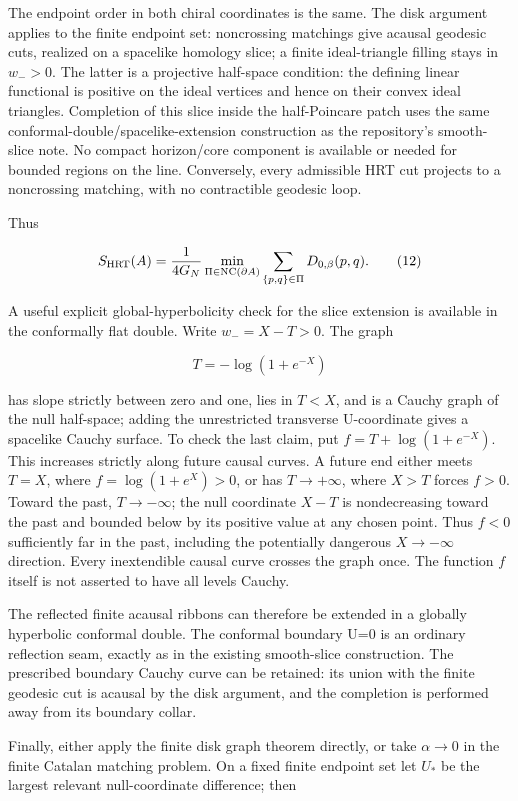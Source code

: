 \documentclass[11pt]{article}
\begin{document}
The endpoint order in both chiral coordinates is the same. The disk
argument applies to the finite endpoint set: noncrossing matchings give
acausal geodesic cuts, realized on a spacelike homology slice; a finite
ideal-triangle filling stays in \(w_->0\). The latter is a projective
half-space condition: the defining linear functional is positive on the
ideal vertices and hence on their convex ideal triangles. Completion of
this slice inside the half-Poincare patch uses the same
conformal-double/spacelike-extension construction as the repository's
smooth-slice note. No compact horizon/core component is available or
needed for bounded regions on the line. Conversely, every admissible HRT
cut projects to a noncrossing matching, with no contractible geodesic
loop.

Thus

\[
S_{\rm HRT}(A)=\frac1{4G_N}
\min_{\Pi\in\mathrm{NC}(\partial A)}
\sum_{\{p,q\}\in\Pi}D_{0,\beta}(p,q).
\tag{12}
\]

A useful explicit global-hyperbolicity check for the slice extension is
available in the conformally flat double. Write \(w_-=X-T>0\). The graph

\[
T=-\log(1+e^{-X})
\]

has slope strictly between zero and one, lies in \(T<X\), and is a
Cauchy graph of the null half-space; adding the unrestricted transverse
U-coordinate gives a spacelike Cauchy surface. To check the last claim,
put \(f=T+\log(1+e^{-X})\). This increases strictly along future causal
curves. A future end either meets \(T=X\), where \(f=\log(1+e^X)>0\), or
has \(T\to+\infty\), where \(X>T\) forces \(f>0\). Toward the past,
\(T\to-\infty\); the null coordinate \(X-T\) is nondecreasing toward the
past and bounded below by its positive value at any chosen point. Thus
\(f<0\) sufficiently far in the past, including the potentially
dangerous \(X\to-\infty\) direction. Every inextendible causal curve
crosses the graph once. The function \(f\) itself is not asserted to
have all levels Cauchy.

The reflected finite acausal ribbons can therefore be extended in a
globally hyperbolic conformal double. The conformal boundary U=0 is an
ordinary reflection seam, exactly as in the existing smooth-slice
construction. The prescribed boundary Cauchy curve can be retained: its
union with the finite geodesic cut is acausal by the disk argument, and
the completion is performed away from its boundary collar.

Finally, either apply the finite disk graph theorem directly, or take
\(\alpha\to0\) in the finite Catalan matching problem. On a fixed finite
endpoint set let \(U_*\) be the largest relevant null-coordinate
difference; then
\end{document}
